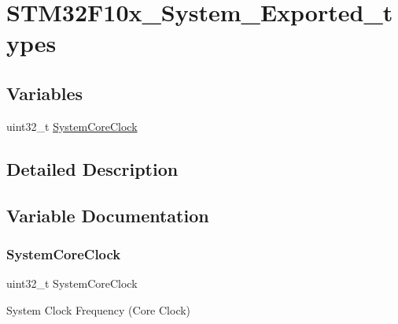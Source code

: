 \hypertarget{group___s_t_m32_f10x___system___exported__types}{}\section{S\+T\+M32\+F10x\+\_\+\+System\+\_\+\+Exported\+\_\+types}
\label{group___s_t_m32_f10x___system___exported__types}
\subsection*{Variables}
\begin{DoxyCompactItemize}
\item 
uint32\+\_\+t \mbox{\hyperlink{group___s_t_m32_f10x___system___exported__types_gaa3cd3e43291e81e795d642b79b6088e6}{System\+Core\+Clock}}
\end{DoxyCompactItemize}


\subsection{Detailed Description}


\subsection{Variable Documentation}
\mbox{\label{group___s_t_m32_f10x___system___exported__types_gaa3cd3e43291e81e795d642b79b6088e6}} 
\subsubsection{\texorpdfstring{SystemCoreClock}{SystemCoreClock}}
{\footnotesize\ttfamily uint32\+\_\+t System\+Core\+Clock}

System Clock Frequency (Core Clock) 